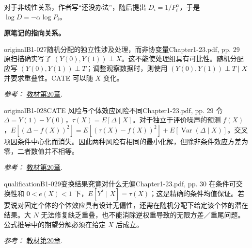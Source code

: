 {对于非线性关系，作者写“还没办法”，随后提出 $D_i=1/P_i^\alpha$，于是 $\log D=-\alpha\log P_i$。

\par{}\smallskip\textbf{原笔记的指向关系。}\par\smallskip
{}
\begin{reviewnote}{original}{B1-027}{随机分配的独立性涉及处理，而非协变量}{Chapter1-23.pdf, pp. 29}
原扫描确实写了 $(Y(0),Y(1))\perp X$。这不能使处理组具有可比性。随机分配应写 $(Y(0),Y(1))\perp T$；调整观察数据时，则使用 $(Y(0),Y(1))\perp T\mid X$ 并要求重叠性。CATE 可以随 $X$ 变化。
\par\smallskip\textit{参考：} \href{https://matheusfacure.github.io/python-causality-handbook/20-Plug-and-Play-Estimators.html}{教材第20章}.
\end{reviewnote}

\begin{reviewnote}{original}{B1-028}{CATE 风险与个体效应风险不同}{Chapter1-23.pdf, pp. 29}
令 $\Delta=Y(1)-Y(0)$，$\tau(X)=E[\Delta\mid X]$。对于独立于评价噪声的预测 $f(X)$，$E[(\Delta-f(X))^2]=E[(\tau(X)-f(X))^2]+E[\operatorname{Var}(\Delta\mid X)]$。交叉项因条件中心化而消失。因此两种风险有相同的最小化解，但除非条件效应方差为零，二者数值并不相等。
\par\smallskip\textit{参考：} \href{https://matheusfacure.github.io/python-causality-handbook/20-Plug-and-Play-Estimators.html}{教材第20章}.
\end{reviewnote}

\begin{reviewnote}{qualification}{B1-029}{变换结果究竟对什么无偏}{Chapter1-23.pdf, pp. 30}
在条件可交换性和 $0<e(X)<1$ 下，$E[Y^*\mid X]=\tau(X)$；这是精确的条件均值保证。若要说对固定个体的个体效应具有设计无偏性，还需在随机分配下给定该个体的潜在结果。大 $N$ 无法修复缺乏重叠，也不能消除逆权重导致的无限方差／重尾问题。公式推导中的期望分解必须在给定 $X$ 后成立。
\par\smallskip\textit{参考：} \href{https://matheusfacure.github.io/python-causality-handbook/20-Plug-and-Play-Estimators.html}{教材第20章}.
\end{reviewnote}

}

